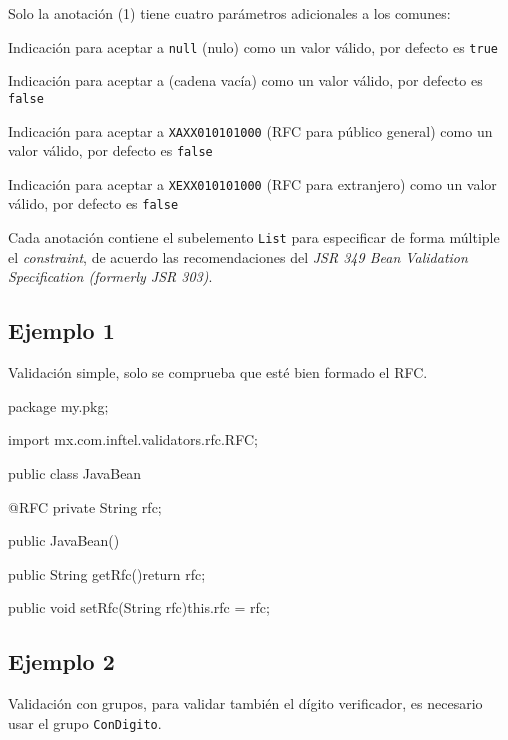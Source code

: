\documentclass[12pt,letterpaper]{article}
\begin{document}
Solo la anotación (1) tiene cuatro parámetros adicionales a los comunes:

\begin{description}[noitemsep]
\item[isNullValueValid] Indicación para aceptar a \texttt{null} (nulo) como un valor válido, por defecto
    es \texttt{true}
\item[isEmptyValueValid] Indicación para aceptar a \texttt{\textquotedbl\textquotedbl} (cadena vacía) como un valor
    válido, por defecto es \texttt{false}
\item[isXAXX010101000ValueValid] Indicación para aceptar a \texttt{\textquotedbl{}XAXX010101000\textquotedbl}
    (RFC para público general) como un valor válido, por defecto es \texttt{false}
\item[isXEXX010101000ValueValid] Indicación para aceptar a \texttt{\textquotedbl{}XEXX010101000\textquotedbl}
    (RFC para extranjero) como un valor válido, por defecto es \texttt{false}
\end{description}

Cada anotación contiene el subelemento \texttt{List} para especificar de forma múltiple el \emph{constraint}, de
acuerdo las recomendaciones del \emph{JSR 349 Bean Validation Specification (formerly JSR 303)}.

\subsection{Ejemplo 1}

Validación simple, solo se comprueba que esté bien formado el RFC.

\begin{listing}{1}
package my.pkg;

import mx.com.inftel.validators.rfc.RFC;

public class JavaBean{

    @RFC
    private String rfc;

    public JavaBean(){}

    public String getRfc(){return rfc;}

    public void setRfc(String rfc){this.rfc = rfc;}
}
\end{listing}

\subsection{Ejemplo 2}

Validación con grupos, para validar también el dígito verificador, es necesario usar el grupo \texttt{ConDigito}.
\end{document}
